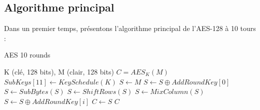 \subsection{Algorithme principal}

Dans un premier temps, présentons l'algorithme principal de l'AES-128 à 10 tours : \\

\begin{algorithm}
    \caption{AES 10 rounds}\label{algorithme AES}
    \begin{algorithmic}
    \Require K (clé, 128 bits), M (clair, 128 bits)
    \Ensure $C = AES_K(M)$ 
    \State $SubKeys[11] \gets KeySchedule(K)$ 
    \State $S \gets M$
    \State $S \gets S \oplus AddRoundKey[0]$
     
        \State $S \gets SubBytes(S)$
        \State $S \gets ShiftRows(S)$
            \State $S \gets MixColumn(S)$
        \EndIf
        \State $S \gets S \oplus AddRoundKey[i]$
    \EndFor
    \State $C \gets S$
    \State \Return $C$

    \end{algorithmic}
\end{algorithm}

\def\TABgen#1{
  \begin{array}{|c|c|c|c|} \hline
  #1_{0,0} & #1_{0,1} & #1_{0,2} & #1_{0,3} \\ \hline
  #1_{1,0} & #1_{1,1} & #1_{1,2} & #1_{1,3} \\ \hline
  #1_{2,0} & #1_{2,1} & #1_{2,2} & #1_{2,3} \\ \hline
  #1_{3,0} & #1_{3,1} & #1_{3,2} & #1_{3,3} \\ \hline
  \end{array}
}
\def\MATgen#1{
  \begin{pmatrix}
  #1_{0,0} & #1_{0,1} & #1_{0,2} & #1_{0,2} \\
  #1_{1,0} & #1_{1,1} & #1_{1,2} & #1_{1,3} \\
  #1_{2,0} & #1_{2,1} & #1_{2,2} & #1_{2,3} \\
  #1_{3,0} & #1_{3,1} & #1_{3,2} & #1_{3,3} 
  \end{pmatrix}
}

